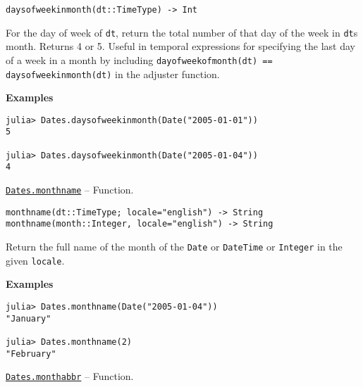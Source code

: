 \begin{adjustwidth}{2em}{0pt}


\begin{verbatim}
daysofweekinmonth(dt::TimeType) -> Int
\end{verbatim}

For the day of week of \texttt{dt}, return the total number of that day of the week in \texttt{dt}{\textquotesingle}s month. Returns 4 or 5. Useful in temporal expressions for specifying the last day of a week in a month by including \texttt{dayofweekofmonth(dt) == daysofweekinmonth(dt)} in the adjuster function.

\textbf{Examples}


\begin{verbatim}
julia> Dates.daysofweekinmonth(Date("2005-01-01"))
5

julia> Dates.daysofweekinmonth(Date("2005-01-04"))
4
\end{verbatim}



\end{adjustwidth}
\hypertarget{16585759639636493546}{} 
\hyperlink{16585759639636493546}{\texttt{Dates.monthname}}  -- {Function.}

\begin{adjustwidth}{2em}{0pt}


\begin{verbatim}
monthname(dt::TimeType; locale="english") -> String
monthname(month::Integer, locale="english") -> String
\end{verbatim}

Return the full name of the month of the \texttt{Date} or \texttt{DateTime} or \texttt{Integer} in the given \texttt{locale}.

\textbf{Examples}


\begin{verbatim}
julia> Dates.monthname(Date("2005-01-04"))
"January"

julia> Dates.monthname(2)
"February"
\end{verbatim}



\end{adjustwidth}
\hypertarget{12804940912944832895}{} 
\hyperlink{12804940912944832895}{\texttt{Dates.monthabbr}}  -- {Function.}

